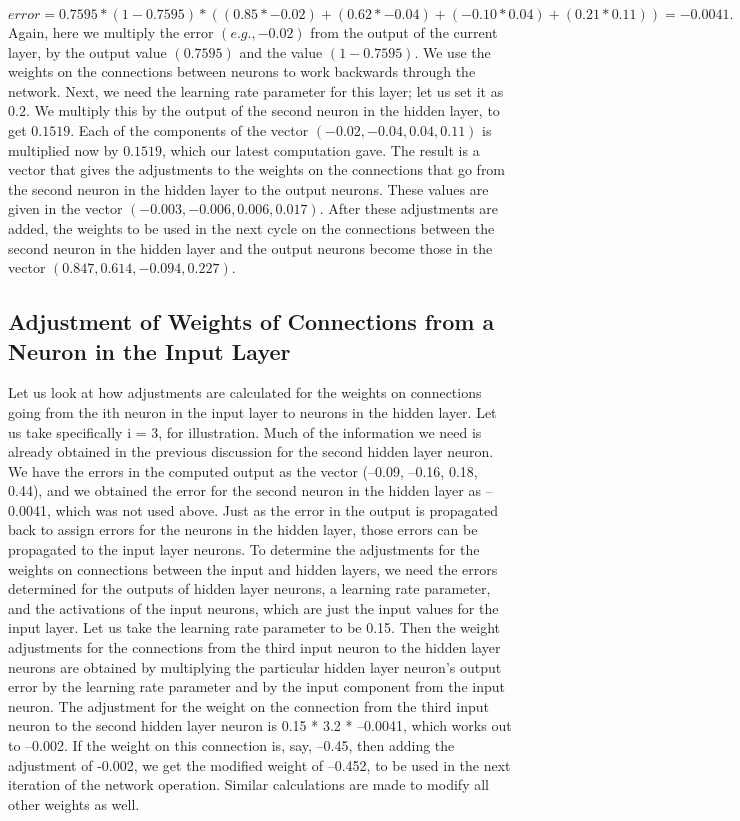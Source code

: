 \documentclass[12pt, right open]{memoir}
\begin{document}
$error = 0.7595 * (1 - 0.7595) * ( (0.85 * -0.02) + (0.62 * -0.04)
+ ( -0.10 * 0.04) + (0.21 * 0.11)) = -0.0041.$\\

Again, here we multiply the error $(e.g., -0.02)$ from the output of the current layer, by the output value $(0.7595)$ and the value $(1-0.7595)$. We use the weights on the connections between neurons to work backwards through the network. Next, we need the learning rate parameter for this layer; let us set it as $0.2$. We multiply this by the output of the second neuron in the hidden layer, to get $0.1519$. Each of the components of the vector $(-0.02, -0.04, 0.04, 0.11)$ is multiplied now by $0.1519$, which our latest computation gave. The result is a vector that gives the adjustments to the weights on the connections that go from the second neuron in the hidden layer to the output neurons. These values are given in the vector $(-0.003, -0.006, 0.006,0.017)$. After these adjustments are added, the weights to be used in the next cycle on the connections between the second neuron in the hidden layer and the output neurons become those in the vector
$(0.847, 0.614, -0.094, 0.227)$.

\subsection{Adjustment of Weights of Connections from a Neuron in
the Input Layer}

Let us look at how adjustments are calculated for the weights on connections going from the ith neuron in the input layer to neurons in the hidden layer. Let us take specifically i = 3, for illustration. Much of the information we need is already obtained in the previous discussion for the second hidden layer neuron. We have the errors in the computed output as the vector (–0.09, –0.16, 0.18, 0.44), and we obtained the error for the second neuron in the hidden layer as –0.0041, which was not used above. Just as the error in the output is propagated back to assign errors for the neurons in the hidden layer, those errors can be propagated to the input layer neurons.
To determine the adjustments for the weights on connections between the input and hidden layers, we need the errors determined for the outputs of hidden layer neurons, a learning rate parameter, and the activations of the input neurons, which are just the input values for the input layer. Let us take the learning rate parameter to be 0.15. Then the weight adjustments for the connections from the third input neuron to the hidden layer neurons are obtained by multiplying the particular hidden layer neuron’s output error by the learning rate parameter and by the input component from the input neuron. The adjustment for the weight on the connection from the third input neuron to the second hidden layer neuron is 0.15 * 3.2 * –0.0041, which works out to –0.002. If the weight on this connection is, say, –0.45, then adding the adjustment of -0.002, we get the modified
weight of –0.452, to be used in the next iteration of the network operation. Similar calculations are made to modify all other weights as well.
\end{document}
